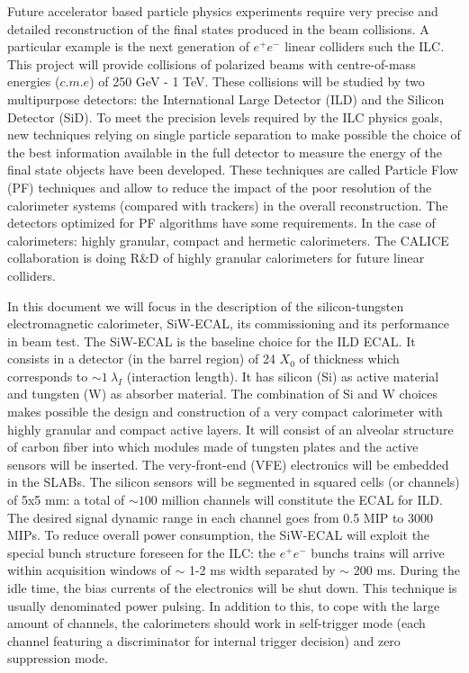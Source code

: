 \documentclass[final,3p,times,twocolumn]{elsarticle}
\begin{document}
Future accelerator based particle physics experiments
require very precise and detailed reconstruction of the final states produced
in the beam collisions. A particular example is the next generation of $e^{+}e^{-}$
linear colliders such the ILC\cite{Behnke:2013xla,Baer:2013cma,Adolphsen:2013jya,Adolphsen:2013kya,Behnke:2013lya}.
This project will provide collisions of polarized beams with centre-of-mass energies ($c.m.e$) of 250 GeV - 1 TeV.
These collisions will be studied by two multipurpose detectors:
the International Large Detector (ILD) and the Silicon Detector (SiD)\cite{Behnke:2013lya}.
To meet the precision levels required by the ILC %
physics goals,
new techniques relying on single particle separation to make possible the choice of the best information available
in the full detector to measure the energy of the final state objects have been developed.
These techniques are called Particle Flow (PF) techniques \cite{Brient:2002gh,Morgunov:2004ed,Sefkow:2015hna}
and allow to reduce the impact of the poor resolution of the calorimeter systems (compared with trackers) in the overall reconstruction.
The detectors optimized for PF algorithms have some requirements. In the case of calorimeters: highly granular, compact
and hermetic calorimeters. 
The CALICE collaboration is doing R\&D of highly granular calorimeters \cite{Sefkow:2015hna} 
for future linear colliders.

In this document we will focus in the description of the silicon-tungsten electromagnetic calorimeter,
SiW-ECAL, its commissioning and its performance in beam test.
The SiW-ECAL is the baseline choice for the ILD ECAL. It consists in a detector (in the barrel region) of 24 $X_{0}$ of thickness which corresponds to $\sim 1~\lambda_{I}$ (interaction length).
It has silicon (Si) as active material and tungsten (W) as absorber material.
The combination of Si and W choices  makes possible the design and construction
of a very compact calorimeter with highly granular and compact active layers.
It will consist of an alveolar structure of carbon fiber into which modules made of tungsten
plates and the active sensors will be inserted. The very-front-end (VFE) electronics will be
embedded in the SLABs. The silicon sensors will be segmented
in squared cells (or channels) of 5x5 mm: a total of $\sim 100$ million channels will constitute the ECAL for ILD.
The desired signal dynamic range in each channel goes from 0.5 MIP to 3000 MIPs.
To reduce overall power consumption, the SiW-ECAL will exploit the special bunch structure
foreseen for the ILC: the $e^{+}e^{-}$ bunchs trains will arrive within
acquisition windows of $\sim$ 1-2 ms width separated by $\sim$ 200 ms. During the idle time, the bias currents of the electronics will be shut down.
This technique is usually denominated power pulsing. In addition to this, to cope with the large amount of channels,
the calorimeters should work in self-trigger mode (each channel featuring a discriminator for internal trigger decision) and zero suppression mode. 
\end{document}
